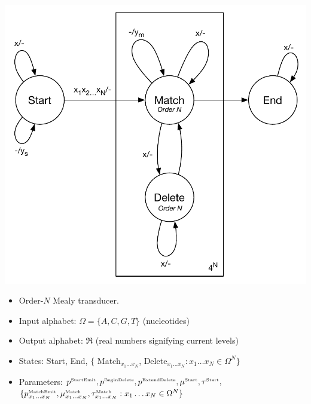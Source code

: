 \documentclass[10pt]{article}
\begin{document}
\includegraphics[width=\textwidth]{figs/Transducer.pdf}

\newcommand\paramlabel[1]{\mbox{\tiny #1}}

\begin{itemize}
\item Order-$N$ Mealy transducer.
\item Input alphabet: $\Omega = \{ A, C, G, T \}$ (nucleotides)
\item Output alphabet: $\Re$ (real numbers signifying current levels)
\item States: Start, End, $\{$ Match${}_{x_1 \ldots x_N}$, Delete${}_{x_1 \ldots x_N}: x_1 \ldots x_N \in \Omega^N \}$
\item Parameters:
$p^{\paramlabel{StartEmit}}, p^{\paramlabel{BeginDelete}}, p^{\paramlabel{ExtendDelete}}, \mu^{\paramlabel{Start}},\tau^{\paramlabel{Start}},$ \\
$\{ p^{\paramlabel{MatchEmit}}_{x_1\ldots x_N}, \mu^{\paramlabel{Match}}_{x_1\ldots x_N},\tau^{\paramlabel{Match}}_{x_1\ldots x_N} : x_1 \ldots x_N \in \Omega^N \}$
\end{itemize}
\end{document}

